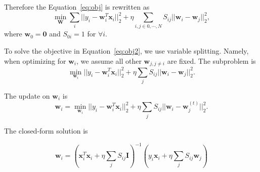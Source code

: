 \documentclass{article}
\begin{document}
Therefore the Equation~\ref{eq:obj} is rewritten as
\begin{equation}
\label{eq:obj2}
\min_{\mathbf{W}}  \sum_i || y_i - \mathbf{w}_i^T \mathbf{x}_i ||_2^2 + \eta \sum_{i,j \in 0, \cdots, N} S_{ij} || \mathbf{w}_i - \mathbf{w}_j ||_2^2,
\end{equation}
where $\mathbf{w}_0 = \mathbf{0}$ and $S_{0i} = 1$ for $\forall i$.


To solve the objective in Equation~\ref{eq:obj2}, we use variable splitting. Namely, when optimizing for $\mathbf{w}_i$, we assume all other $\mathbf{w}_{j, j\neq i}$ are fixed. The subproblem is
\begin{equation}
\label{eq:subobj}
\min_{\mathbf{w}_i}   ||y_i - \mathbf{w}_i^T \mathbf{x}_i ||_2^2 + \eta \sum_j S_{ij}|| \mathbf{w}_i - \mathbf{w}_j||_2^2.
\end{equation}



The update on $\mathbf{w}_i$ is
\[
\mathbf{w}_i = \min_{\mathbf{w}_i}   ||y_i - \mathbf{w}_i^T \mathbf{x}_i ||_2^2 + \eta \sum_j S_{ij} || \mathbf{w}_i - \mathbf{w}_j^{(t)} ||_2^2.
\]

The closed-form solution is

\begin{equation}
\mathbf{w}_i = (\mathbf{x}_i^T \mathbf{x}_i + \eta \sum_j S_{ij} \mathbf{I} )^{-1} (y_i \mathbf{x}_i + \eta \sum_j S_{ij} \mathbf{w}_j) 
\end{equation}
\end{document}
